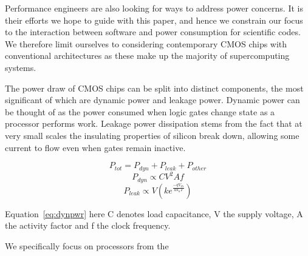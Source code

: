 Performance engineers are also looking for ways to address power concerns. It is their efforts we hope to guide with this paper, and hence we constrain our focus to the interaction between software and power consumption for scientific codes. We therefore limit ourselves to considering contemporary CMOS chips with conventional architectures as these make up the majority of supercomputing systems.


The power draw of CMOS chips can be split into distinct components, the most significant of which are dynamic power and leakage power. Dynamic power can be thought of as the power consumed when logic gates change state as a processor performs work. Leakage power dissipation stems from the fact that at very small scales the insulating properties of silicon break down, allowing some current to flow even when gates remain inactive.




\begin{equation}
\label{eq:totpwr}
P_{tot} = P_{dyn} + P_{leak} + P_{other}
\end{equation}
\begin{equation} 
\label{eq:dynpwr}
P_{dyn} \propto CV^{2}Af
\end{equation}
\begin{equation}
\label{eq:leakpwr}
P_{leak} \propto V\left(ke^{\frac{-qV_{th}}{ak_{a}T}}\right)
\end{equation}

 Equation~\ref{eq:dynpwr} 
here C denotes load capacitance, V the supply voltage, A the activity factor and f the clock frequency.















 We specifically focus on processors from the


